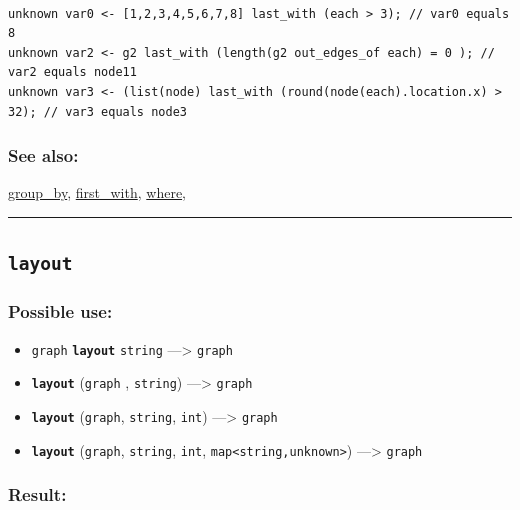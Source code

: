\documentclass[]{book}
\providecommand{\tightlist}{%
  \setlength{\itemsep}{0pt}\setlength{\parskip}{0pt}}
\theoremstyle{definition}
\theoremstyle{definition}
\theoremstyle{definition}
\theoremstyle{remark}
\begin{document}
\begin{verbatim}
 
unknown var0 <- [1,2,3,4,5,6,7,8] last_with (each > 3); // var0 equals 8 
unknown var2 <- g2 last_with (length(g2 out_edges_of each) = 0 ); // var2 equals node11 
unknown var3 <- (list(node) last_with (round(node(each).location.x) > 32); // var3 equals node3
\end{verbatim}

\subsubsection{See also:}\label{see-also-124}

\href{operators-d-to-h.html\#group_by}{group\_by},
\href{operators-d-to-h.html\#first_with}{first\_with},
\href{operators-s-to-z.html\#where}{where},

\begin{center}\rule{0.5\linewidth}{\linethickness}\end{center}

\subsection{\texorpdfstring{\texttt{layout}}{layout}}\label{layout}

\subsubsection{Possible use:}\label{possible-use-319}

\begin{itemize}
\tightlist
\item
  \texttt{graph} \textbf{\texttt{layout}} \texttt{string}
  ---\textgreater{} \texttt{graph}
\item
  \textbf{\texttt{layout}} (\texttt{graph} , \texttt{string})
  ---\textgreater{} \texttt{graph}
\item
  \textbf{\texttt{layout}} (\texttt{graph}, \texttt{string},
  \texttt{int}) ---\textgreater{} \texttt{graph}
\item
  \textbf{\texttt{layout}} (\texttt{graph}, \texttt{string},
  \texttt{int}, \texttt{map\textless{}string,unknown\textgreater{}})
  ---\textgreater{} \texttt{graph}
\end{itemize}

\subsubsection{Result:}\label{result-309}
\end{document}
